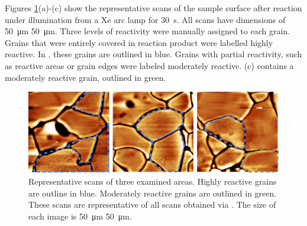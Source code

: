 Figures \ref{fig:fe2o3afmscans}(a)-(c) show the representative  scans of the
sample surface after reaction under illumination from a Xe arc lamp for \SI{30}{\second}.
All scans have dimensions of \SI{50}{\micro\meter} \texttimes{} \SI{50}{\micro\meter}.
Three levels of reactivity were manually assigned to each grain. Grains that were entirely
covered in reaction product were labelled highly reactive. In ,
these grains are outlined in blue. Grains with partial reactivity, such as reactive areas
or grain edges were labeled moderately reactive. (c) contains a
moderately reactive grain, outlined in green.
\begin{figure}[b]
	\includegraphics[width=\textwidth]{fe2o3afmscans.pdf}
	\caption[Representative  scans of three examined areas]{%
		Representative  scans of three examined areas. Highly reactive grains
are outline in blue. 
		Moderately reactive grains are outlined in green. These scans are representative
of all scans 
		obtained via . The size of each image is \SI{50}{\micro\meter}
\texttimes{} \SI{50}{\micro\meter}.}
	\label{fig:fe2o3afmscans}
\end{figure} 

